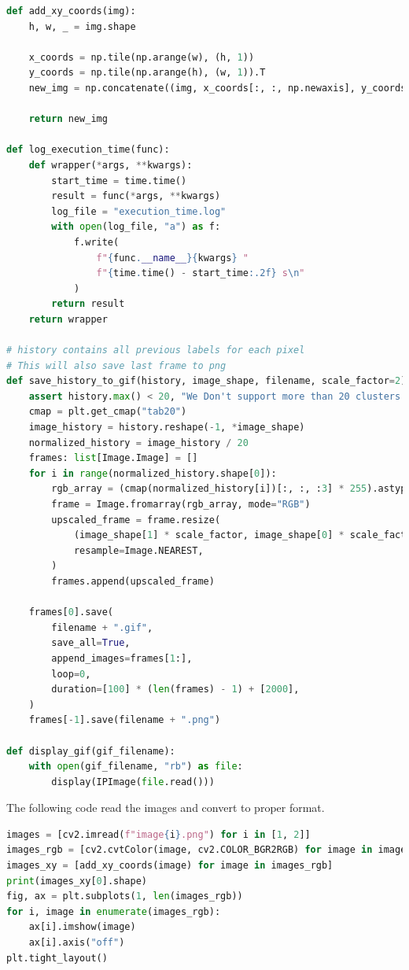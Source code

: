 \documentclass{homework}
\begin{document}
\begin{lstlisting}[language=Python]
def add_xy_coords(img):
    h, w, _ = img.shape
    
    x_coords = np.tile(np.arange(w), (h, 1))
    y_coords = np.tile(np.arange(h), (w, 1)).T
    new_img = np.concatenate((img, x_coords[:, :, np.newaxis], y_coords[:, :, np.newaxis]), axis=-1)

    return new_img

def log_execution_time(func):
    def wrapper(*args, **kwargs):
        start_time = time.time()
        result = func(*args, **kwargs)
        log_file = "execution_time.log"
        with open(log_file, "a") as f:
            f.write(
                f"{func.__name__}{kwargs} "
                f"{time.time() - start_time:.2f} s\n"
            )
        return result
    return wrapper

# history contains all previous labels for each pixel
# This will also save last frame to png
def save_history_to_gif(history, image_shape, filename, scale_factor=2):
    assert history.max() < 20, "We Don't support more than 20 clusters cmap :D"
    cmap = plt.get_cmap("tab20")
    image_history = history.reshape(-1, *image_shape)
    normalized_history = image_history / 20
    frames: list[Image.Image] = []
    for i in range(normalized_history.shape[0]):
        rgb_array = (cmap(normalized_history[i])[:, :, :3] * 255).astype(np.uint8)
        frame = Image.fromarray(rgb_array, mode="RGB")
        upscaled_frame = frame.resize(
            (image_shape[1] * scale_factor, image_shape[0] * scale_factor),
            resample=Image.NEAREST,
        )
        frames.append(upscaled_frame)

    frames[0].save(
        filename + ".gif",
        save_all=True,
        append_images=frames[1:],
        loop=0,
        duration=[100] * (len(frames) - 1) + [2000],
    )
    frames[-1].save(filename + ".png")

def display_gif(gif_filename):
    with open(gif_filename, "rb") as file:
        display(IPImage(file.read()))
\end{lstlisting}

The following code read the images and convert to proper format.

\begin{lstlisting}[language=Python]
images = [cv2.imread(f"image{i}.png") for i in [1, 2]]
images_rgb = [cv2.cvtColor(image, cv2.COLOR_BGR2RGB) for image in images]
images_xy = [add_xy_coords(image) for image in images_rgb]
print(images_xy[0].shape)
fig, ax = plt.subplots(1, len(images_rgb))
for i, image in enumerate(images_rgb):
    ax[i].imshow(image)
    ax[i].axis("off")
plt.tight_layout()
\end{lstlisting}
\end{document}
